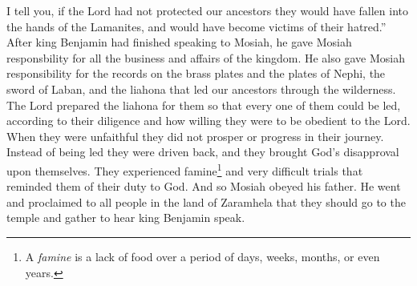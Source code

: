 \bverse \iffalse For I say unto you, that if he had not extended his arm in the preservation of our fathers they must have fallen into the hands of the Lamanites, and become victims to their hatred. \fi
I tell you, if the Lord had not protected our ancestors they would have fallen into the hands of the Lamanites, and would have become victims of their hatred.''
\bverse \iffalse And it came to pass that after king Benjamin had made an end of these sayings to his son, that he gave him charge concerning all the affairs of the kingdom. \fi
After king Benjamin had finished speaking to Mosiah, he gave Mosiah responsbility for all the business and affairs of the kingdom.
\bverse \iffalse And moreover, he also gave him charge concerning the records which were engraven on the plates of brass; and also the plates of Nephi; and also, the sword of Laban, and the ball or director, which led our fathers through the wilderness, which was prepared by the hand of the Lord that thereby they might be led, every one according to the heed and diligence which they gave unto him. \fi
He also gave Mosiah responsibility for the records on the brass plates and the plates of Nephi, the sword of Laban, and the liahona that led our ancestors through the wilderness. The Lord prepared the liahona for them so that every one of them could be led, according to their diligence and how willing they were to be obedient to the Lord.
\bverse \iffalse Therefore, as they were unfaithful they did not prosper nor progress in their journey, but were driven back, and incurred the displeasure of God upon them; and therefore they were smitten with famine and sore afflictions, to stir them up in remembrance of their duty. \fi
When they were unfaithful they did not prosper or progress in their journey. Instead of being led they were driven back, and they brought God's disapproval upon themselves. They experienced famine\footnote{A \textit{famine} is a lack of food over a period of days, weeks, months, or even years.} and very difficult trials that reminded them of their duty to God.
\bverse \iffalse And now, it came to pass that Mosiah went and did as his father had commanded him, and proclaimed unto all the people who were in the land of Zarahemla that thereby they might gather themselves together, to go up to the temple to hear the words which his father should speak unto them. \fi
And so Mosiah obeyed his father. He went and proclaimed to all people in the land of Zaramhela that they should go to the temple and gather to hear king Benjamin speak.


